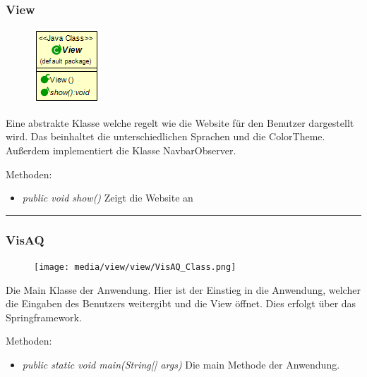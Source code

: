 \subsubsection{View}
\begin{minipage}{0.3\textwidth}
    \begin{figure}[H]
        {\centering\includegraphics[scale = 0.7
        ]{media/view/view/View_Class.png}}
    \end{figure}
    \end{minipage} \hfill
    \begin{minipage}{0.6\textwidth}
Eine abstrakte Klasse welche regelt wie die Website für den Benutzer dargestellt wird. Das beinhaltet die unterschiedlichen Sprachen und die ColorTheme. Außerdem implementiert die Klasse NavbarObserver.
\end{minipage}
\vspace{\baselineskip}
Methoden: \begin{itemize} [noitemsep]
    \item \emph{public void show()} Zeigt die Website an
\end{itemize}

\rule{\textwidth}{0.4pt}
\subsubsection{VisAQ}
\begin{minipage}{0.3\textwidth}
    \begin{figure}[H]
        {\centering\texttt{[image: media/view/view/VisAQ\_Class.png]}}
    \end{figure}
    \end{minipage} \hfill
    \begin{minipage}{0.6\textwidth}
Die Main Klasse der Anwendung. Hier ist der Einstieg in die Anwendung, welcher die Eingaben des Benutzers weitergibt und die View öffnet. Dies erfolgt über das Springframework.
\end{minipage}
\vspace{\baselineskip}
Methoden: \begin{itemize} [noitemsep]
    \item \emph{public static void main(String[] args)} Die main Methode der Anwendung.
\end{itemize} 

